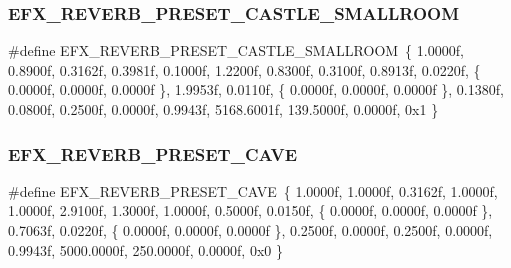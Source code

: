 \subsubsection{\texorpdfstring{E\+F\+X\+\_\+\+R\+E\+V\+E\+R\+B\+\_\+\+P\+R\+E\+S\+E\+T\+\_\+\+C\+A\+S\+T\+L\+E\+\_\+\+S\+M\+A\+L\+L\+R\+O\+OM}{EFX\_REVERB\_PRESET\_CASTLE\_SMALLROOM}}
{\footnotesize\ttfamily \#define E\+F\+X\+\_\+\+R\+E\+V\+E\+R\+B\+\_\+\+P\+R\+E\+S\+E\+T\+\_\+\+C\+A\+S\+T\+L\+E\+\_\+\+S\+M\+A\+L\+L\+R\+O\+OM~\{ 1.\+0000f, 0.\+8900f, 0.\+3162f, 0.\+3981f, 0.\+1000f, 1.\+2200f, 0.\+8300f, 0.\+3100f, 0.\+8913f, 0.\+0220f, \{ 0.\+0000f, 0.\+0000f, 0.\+0000f \}, 1.\+9953f, 0.\+0110f, \{ 0.\+0000f, 0.\+0000f, 0.\+0000f \}, 0.\+1380f, 0.\+0800f, 0.\+2500f, 0.\+0000f, 0.\+9943f, 5168.\+6001f, 139.\+5000f, 0.\+0000f, 0x1 \}}

\mbox{\label{efx-presets_8h_a0ca71faa4923155557a0b9a8c5227775}} 
\subsubsection{\texorpdfstring{E\+F\+X\+\_\+\+R\+E\+V\+E\+R\+B\+\_\+\+P\+R\+E\+S\+E\+T\+\_\+\+C\+A\+VE}{EFX\_REVERB\_PRESET\_CAVE}}
{\footnotesize\ttfamily \#define E\+F\+X\+\_\+\+R\+E\+V\+E\+R\+B\+\_\+\+P\+R\+E\+S\+E\+T\+\_\+\+C\+A\+VE~\{ 1.\+0000f, 1.\+0000f, 0.\+3162f, 1.\+0000f, 1.\+0000f, 2.\+9100f, 1.\+3000f, 1.\+0000f, 0.\+5000f, 0.\+0150f, \{ 0.\+0000f, 0.\+0000f, 0.\+0000f \}, 0.\+7063f, 0.\+0220f, \{ 0.\+0000f, 0.\+0000f, 0.\+0000f \}, 0.\+2500f, 0.\+0000f, 0.\+2500f, 0.\+0000f, 0.\+9943f, 5000.\+0000f, 250.\+0000f, 0.\+0000f, 0x0 \}}

\mbox{\label{efx-presets_8h_a60e9065d8955c7c33095c82587f815f0}} 

